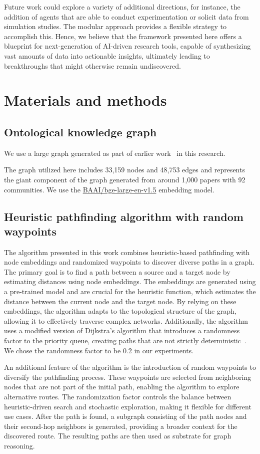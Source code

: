 \documentclass{article}
\begin{document}
Future work could explore a variety of additional directions, for instance, the addition of agents that are able to conduct experimentation or solicit data from simulation studies. The modular approach provides a flexible strategy to accomplish this. Hence, we believe that the framework presented here offers a blueprint for next-generation of AI-driven research tools, capable of synthesizing vast amounts of data into actionable insights, ultimately leading to breakthroughs that might otherwise remain undiscovered. 

\section{Materials and methods}

\subsection{Ontological knowledge graph}
We use a large graph generated as part of earlier work~\cite{buehler2024accelerating} in this research.

The graph utilized here includes 33,159 nodes and 48,753 edges and represents the giant component of the graph generated from around 1,000 papers with 92 communities. 
%
We use the \url{BAAI/bge-large-en-v1.5} embedding model. 

\subsection{Heuristic pathfinding algorithm with random waypoints}
\label{heuristic_pathfinding}
The algorithm presented in this work combines heuristic-based pathfinding with node embeddings and randomized waypoints to discover diverse paths in a graph. The primary goal is to find a path between a source and a target node by estimating distances using node embeddings. The embeddings are generated using a pre-trained model and are crucial for the heuristic function, which estimates the distance between the current node and the target node. By relying on these embeddings, the algorithm adapts to the topological structure of the graph, allowing it to effectively traverse complex networks. Additionally, the algorithm uses a modified version of Dijkstra's algorithm that introduces a randomness factor to the priority queue, creating paths that are not strictly deterministic~\cite{dijkstra1959note}. We chose the randomness factor to be 0.2 in our experiments. 

An additional feature of the algorithm is the introduction of random waypoints to diversify the pathfinding process. These waypoints are selected from neighboring nodes that are not part of the initial path, enabling the algorithm to explore alternative routes. The randomization factor controls the balance between heuristic-driven search and stochastic exploration, making it flexible for different use cases. After the path is found, a subgraph consisting of the path nodes and their second-hop neighbors is generated, providing a broader context for the discovered route. The resulting paths are then used as substrate for graph reasoning.
\end{document}
